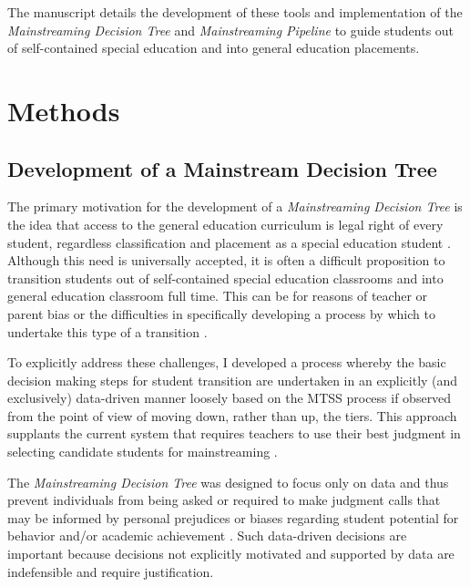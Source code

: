 \documentclass[twoside]{article}
\begin{document}
The manuscript details the development of these tools and implementation of the \textit{Mainstreaming Decision Tree} and \textit{Mainstreaming Pipeline} to guide students out of self-contained special education and into general education placements.

\section{Methods}
\subsection{Development of a Mainstream Decision Tree}
The primary motivation for the development of a \textit{Mainstreaming Decision Tree} is the idea that access to the general education curriculum is legal right of every student, regardless classification and placement as a special education student \parencite{hocutt1996effectiveness,johnson2005key,conway1988mainstreaming}. Although this need is universally accepted, it is often a difficult proposition to transition students out of self-contained special education classrooms and into general education classroom full time. This can be for reasons of teacher or parent bias \parencite{skiba2008achieving,marden2013criteria} or the difficulties in specifically developing a process by which to undertake this type of a transition \parencite{cauley2006developing,fuchs1994classroom}.

To explicitly address these challenges, I developed a process whereby the basic decision making steps for student transition are undertaken in an explicitly (and exclusively) data-driven manner loosely based on the MTSS process if observed from the point of view of moving down, rather than up, the tiers. This approach supplants the current system that requires teachers to use their best judgment in selecting candidate students for mainstreaming \parencite{fuchs1993conservative,fuchs1994classroom,marden2013criteria,mathes1998preparing,wadsworth1999preparing,wadsworth1999preparing,fuchs1994best}. 

The \textit{Mainstreaming Decision Tree} was designed to focus only on data and thus prevent individuals from being asked or required to make judgment calls that may be informed by personal prejudices or biases regarding student potential for behavior and/or academic achievement \parencite{raines2012universal,reynolds2009response}. Such data-driven decisions are important because decisions not explicitly motivated and supported by data are indefensible and require justification.
\end{document}
